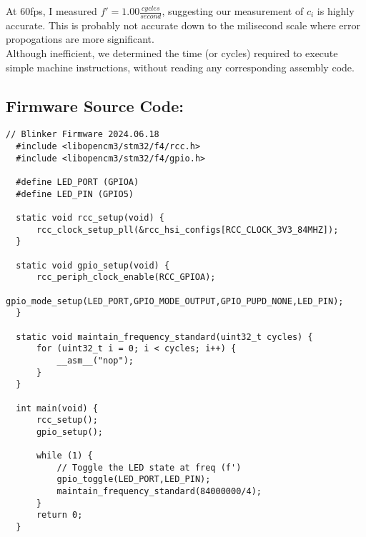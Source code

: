 \documentclass[a4paper,12pt]{article}   	%
\begin{document}
\begin{flushleft}
At 60fps, I measured $f' = 1.00 \frac{cycles}{second}$, suggesting our measurement of $c_i$ is highly accurate. 
This is probably not accurate down to the milisecond scale where error propogations are more significant.\\[2 ex]

Although inefficient, we determined the time (or cycles) required 
to execute simple machine instructions, without reading any corresponding assembly code.



\end{flushleft}

\subsection*{Firmware Source Code:}
\begin{lstlisting}[backgroundcolor = \color{beige}]
  // Blinker Firmware 2024.06.18
  #include <libopencm3/stm32/f4/rcc.h>
  #include <libopencm3/stm32/f4/gpio.h>
  
  #define LED_PORT (GPIOA)
  #define LED_PIN (GPIO5)
  
  static void rcc_setup(void) {
      rcc_clock_setup_pll(&rcc_hsi_configs[RCC_CLOCK_3V3_84MHZ]);
  }

  static void gpio_setup(void) {
      rcc_periph_clock_enable(RCC_GPIOA);
      gpio_mode_setup(LED_PORT,GPIO_MODE_OUTPUT,GPIO_PUPD_NONE,LED_PIN);
  }
  
  static void maintain_frequency_standard(uint32_t cycles) {
      for (uint32_t i = 0; i < cycles; i++) {
          __asm__("nop");
      }
  }
  
  int main(void) {
      rcc_setup();
      gpio_setup();
  
      while (1) {
          // Toggle the LED state at freq (f')
          gpio_toggle(LED_PORT,LED_PIN);
          maintain_frequency_standard(84000000/4);
      }
      return 0;
  }


\end{lstlisting}
\end{document}
